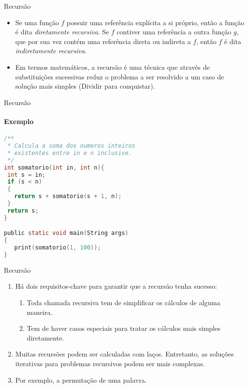 \begin{frame}[fragile]{Recursão}
\begin{itemize}
	\item Se uma função $f$ possuir uma referência explícita a si próprio, então a função é dita \textit{diretamente recursiva}. Se $f$ contiver uma referência a outra função $g$, que por sua vez contém uma referência direta ou indireta a $f$, então $f$ é dita \textit{indiretamente recursiva}.
	\item Em termos matemáticos, a recursão é uma técnica que através de substituições sucessivas reduz o problema a ser resolvido a um caso de solução mais simples (Dividir para conquistar).
\end{itemize}
\end{frame}


\begin{frame}[fragile]{Recursão}
\framesubtitle{Exemplo}
\footnotesize
\begin{lstlisting}[language=C]
/**
 * Calcula a soma dos numeros inteiros 
 * existentes entre in e n inclusive.
 */
int somatorio(int in, int n){   
 int s = in;
 if (s < n)
 {      
   return s + somatorio(s + 1, n);
 }
 return s;
}

public static void main(String args)
{    
   print(somatorio(1, 100));
}
\end{lstlisting}
\end{frame}


\begin{frame}[fragile]{Recursão}
\begin{enumerate}
	\item Há dois requisitos-chave para garantir que a recursão tenha sucesso:	
			\begin{enumerate}
				\item Toda chamada recursiva tem de simplificar os cálculos de alguma maneira.
				\item Tem de haver casos especiais para tratar os cálculos mais simples diretamente.
			\end{enumerate}
	\item Muitas recursões podem ser calculadas com laços. Entretanto, as soluções iterativas para problemas recursivos podem ser mais complexas.
	\item Por exemplo, a permutação de uma palavra.
\end{enumerate}
\end{frame}

